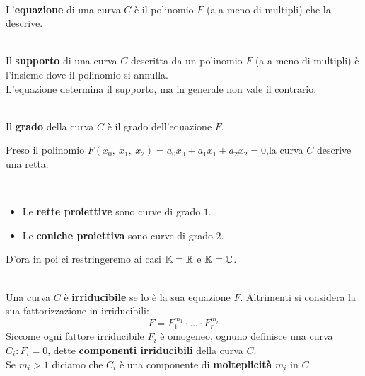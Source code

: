 \begin{define}~{}\\
	L'\textbf{equazione} di una curva $C$ è il polinomio $F$ (a a meno di multipli) che la descrive.
\end{define}
\begin{define}~{}\\
	Il \textbf{supporto} di una curva $C$ descritta da un polinomio $F$ (a a meno di multipli) è l'insieme dove il polinomio si annulla.\\
	L'equazione determina il supporto, ma in generale non vale il contrario.
\end{define}
\begin{define}~{}\\
	Il \textbf{grado} della curva $C$ è il grado dell'equazione $F$.
\end{define}
\begin{example}
	Preso il polinomio $F(x_0,\ x_1,\ x_2)=a_0x_0+a_1x_1+a_2x_2=0$,la curva $C$ descrive una retta.
\end{example}
\begin{define}~{}
	\begin{itemize}
		\item Le \textbf{rette proiettive} sono curve di grado $1$.
		\item Le \textbf{coniche proiettiva} sono curve di grado $2$.
	\end{itemize}
\vspace{-3mm}
\end{define}
D'ora in poi ci restringeremo ai casi $\mathbb{K}=\mathbb{R}$ e $\mathbb{K}=\mathbb{C}$.
\begin{define}~{}\\
Una curva $C$ è \textbf{irriducibile} se lo è la sua equazione $F$. Altrimenti si considera la sua fattorizzazione in irriducibili:
\begin{equation}
	F=F_1^{m_1}\cdot \ldots \cdot F_r^{m_r}
\end{equation}
Siccome ogni fattore irriducibile $F_i$ è omogeneo, ognuno definisce una curva $C_i\colon F_i=0$, dette \textbf{componenti irriducibili} della curva $C$.\\
Se $m_i>1$ diciamo che $C_i$ è una componente di \textbf{molteplicità} $m_i$ in $C$
\end{define}

